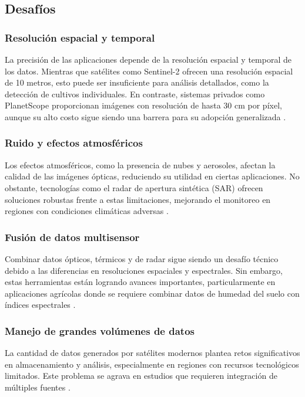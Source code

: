     \subsection{Desafíos}
        \subsubsection{Resolución espacial y temporal}
            La precisión de las aplicaciones depende de la resolución espacial y temporal de los datos. Mientras que satélites como Sentinel-2 ofrecen una resolución espacial de 10 metros, esto puede ser insuficiente para análisis detallados, como la detección de cultivos individuales. En contraste, sistemas privados como PlanetScope proporcionan imágenes con resolución de hasta 30 cm por píxel, aunque su alto costo sigue siendo una barrera para su adopción generalizada \autocite{schiavon2021monitoring}.
        
        \subsubsection{Ruido y efectos atmosféricos}
            Los efectos atmosféricos, como la presencia de nubes y aerosoles, afectan la calidad de las imágenes ópticas, reduciendo su utilidad en ciertas aplicaciones. No obstante, tecnologías como el radar de apertura sintética (SAR) ofrecen soluciones robustas frente a estas limitaciones, mejorando el monitoreo en regiones con condiciones climáticas adversas \autocite{caballero2019sentinel}.
        
        \subsubsection{Fusión de datos multisensor}
            Combinar datos ópticos, térmicos y de radar sigue siendo un desafío técnico debido a las diferencias en resoluciones espaciales y espectrales. Sin embargo, estas herramientas están logrando avances importantes, particularmente en aplicaciones agrícolas donde se requiere combinar datos de humedad del suelo con índices espectrales \autocite{rast2019copernicus}.
        

        \subsubsection{Manejo de grandes volúmenes de datos}
            La cantidad de datos generados por satélites modernos plantea retos significativos en almacenamiento y análisis, especialmente en regiones con recursos tecnológicos limitados. Este problema se agrava en estudios que requieren integración de múltiples fuentes \autocite{matgen2020feasibility}.


